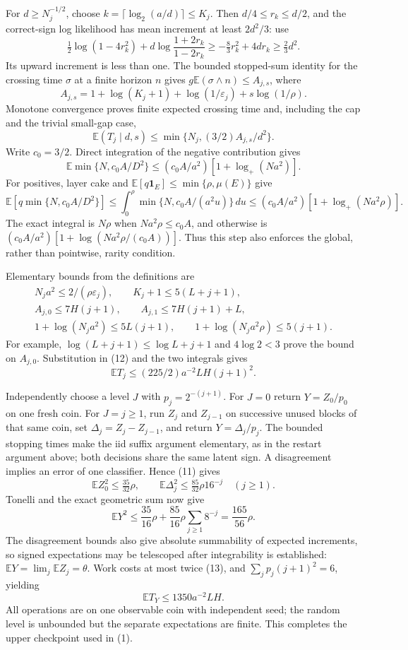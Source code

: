 \documentclass[11pt]{article}
\newcommand{\E}{\mathbb E}
\newcommand{\ind}{\mathbf1}
\begin{document}
For $d\ge N_j^{-1/2}$, choose $k=\lceil\log_2(a/d)\rceil\le K_j$.
Then $d/4\le r_k\le d/2$, and the correct-sign log likelihood has mean
increment at least $2d^2/3$: use
\[
 \tfrac12\log(1-4r_k^2)
       +d\log\frac{1+2r_k}{1-2r_k}
 \ge-\tfrac83r_k^2+4dr_k\ge\tfrac23d^2.
\]
Its upward increment is less than one. The bounded stopped-sum identity for
the crossing time $\sigma$ at a finite horizon $n$ gives
$g\E(\sigma\wedge n)\le A_{j,s}$, where
\[
 A_{j,s}=1+\log(K_j+1)+\log(1/\varepsilon_j)+s\log(1/\rho).
\]
Monotone convergence proves finite expected crossing time and, including the
cap and the trivial small-gap case,
\[
 \E(T_j\mid d,s)\le\min\{N_j,(3/2)A_{j,s}/d^2\}.        \tag{12}
\]
Write $c_0=3/2$. Direct integration of the negative contribution gives
\[
 \E\min\{N,c_0A/D^2\}
 \le(c_0A/a^2)[1+\log_+(Na^2)].
\]
For positives, layer cake and
$\E[q\ind_E]\le\min\{\rho,\mu(E)\}$ give
\[
 \E[q\min\{N,c_0A/D^2\}]
 \le\int_0^\rho\min\{N,c_0A/(a^2u)\}\,du
 \le(c_0A/a^2)[1+\log_+(Na^2\rho)].
\]
The exact integral is $N\rho$ when $Na^2\rho\le c_0A$, and otherwise is
$(c_0A/a^2)[1+\log(Na^2\rho/(c_0A))]$. Thus this step also enforces the
global, rather than pointwise, rarity condition.

Elementary bounds from the definitions are
\[
\begin{gathered}
 N_ja^2\le2/(\rho\varepsilon_j),\qquad K_j+1\le5(L+j+1),\\
 A_{j,0}\le7H(j+1),\qquad A_{j,1}\le7H(j+1)+L,\\
 1+\log(N_ja^2)\le5L(j+1),\qquad
 1+\log(N_ja^2\rho)\le5(j+1).
\end{gathered}
\]
For example, $\log(L+j+1)\le\log L+j+1$ and $4\log2<3$ prove the
bound on $A_{j,0}$. Substitution in (12) and the two integrals gives
\[
 \E T_j\le(225/2)a^{-2}LH(j+1)^2.                        \tag{13}
\]

Independently choose a level $J$ with $p_j=2^{-(j+1)}$. For $J=0$ return
$Y=Z_0/p_0$ on one fresh coin. For $J=j\ge1$, run $Z_j$ and $Z_{j-1}$
on successive unused blocks of that same coin, set $\Delta_j=Z_j-Z_{j-1}$,
and return $Y=\Delta_j/p_j$. The bounded stopping times make the iid suffix
argument elementary, as in the restart argument above; both decisions share
the same latent sign. A disagreement implies an error of one classifier.
Hence (11) gives
\[
 \E Z_0^2\le\tfrac{35}{32}\rho,
 \qquad \E\Delta_j^2\le\tfrac{85}{32}\rho16^{-j}\quad(j\ge1).
\]
Tonelli and the exact geometric sum now give
\[
 \E Y^2\le\frac{35}{16}\rho+
                 \frac{85}{16}\rho\sum_{j\ge1}8^{-j}
            =\frac{165}{56}\rho.
\]
The disagreement bounds also give absolute summability of expected increments,
so signed expectations may be telescoped after integrability is established:
$\E Y=\lim_j\E Z_j=\theta$. Work costs at most twice (13), and
$\sum_jp_j(j+1)^2=6$, yielding
\[
 \E T_Y\le1350a^{-2}LH.
\]
All operations are on one observable coin with independent seed; the random
level is unbounded but the separate expectations are finite. This completes
the upper checkpoint used in (1).
\end{document}
